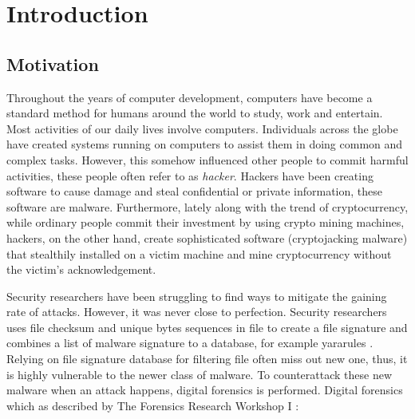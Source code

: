 \chapter[Introduction]{Introduction}

\section[Motivation]{Motivation}

Throughout the years of computer development, computers have become a standard
method for humans around the world to study, work and entertain. Most
activities of our daily lives involve computers. Individuals across the globe
have created systems running on computers to assist them in doing common and
complex tasks. However, this somehow influenced other people to commit harmful
activities, these people often refer to as \textit{hacker}. Hackers have been
creating software to cause damage and steal confidential or private
information, these software are malware. Furthermore, lately along with the
trend of cryptocurrency, while ordinary people commit their investment by using
crypto mining machines, hackers, on the other hand, create sophisticated
software (cryptojacking malware) that stealthily installed on a victim machine
and mine cryptocurrency without the victim's acknowledgement.

Security researchers have been struggling to find ways to mitigate the gaining
rate of attacks. However, it was never close to perfection. Security
researchers uses file checksum and unique bytes sequences in file to create a
file signature and combines a list of malware signature to a database, for
example yararules \cite{yararules}. Relying on file signature database for
filtering file often miss out new one, thus, it is highly vulnerable to the
newer class of malware. To counterattack these new malware when an attack
happens, digital forensics is performed. Digital forensics which as described
by The Forensics Research Workshop I \cite{roadmap}:



